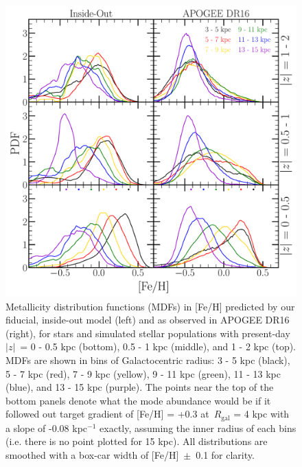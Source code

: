 \documentclass[fleqn, usenatbib]{mnras}
\begin{document}
\begin{figure} 
\centering 
\includegraphics[scale = 0.34]{mdf_3panel_fe.pdf} 
\caption{Metallicity distribution functions (MDFs) in [Fe/H] predicted by our 
fiducial, inside-out model (left) and as observed in APOGEE DR16 (right), for 
stars and simulated stellar populations with present-day~$\left|z\right|$~= 0 - 
0.5 kpc (bottom), 0.5 - 1 kpc (middle), and 1 - 2 kpc (top). MDFs are shown in 
bins of Galactocentric radius: 3 - 5 kpc (black), 5 - 7 kpc (red), 7 - 9 kpc 
(yellow), 9 - 11 kpc (green), 11 - 13 kpc (blue), and 13 - 15 kpc (purple). 
The points near the top of the bottom panels denote what the mode abundance 
would be if it followed out target gradient of [Fe/H] = +0.3 at~$R_\text{gal}$ 
= 4 kpc with a slope of -0.08 kpc$^{-1}$ exactly, assuming the inner radius of 
each bins (i.e. there is no point plotted for 15 kpc). All distributions are 
smoothed with a box-car width of [Fe/H]~$\pm$~0.1 for clarity. } 
\label{fig:mdf_3panel_fe} 
\end{figure} 
\end{document}
